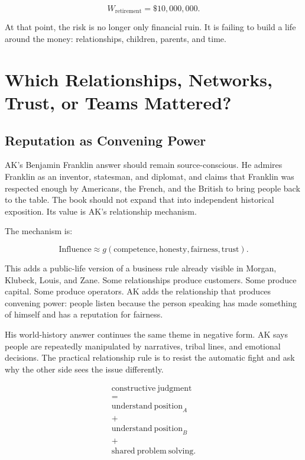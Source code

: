 \documentclass[11pt,oneside]{book}
\begin{document}
\begin{equation}
W_{\mathrm{retirement}}=\$10{,}000{,}000.
\end{equation}

At that point, the risk is no longer only financial ruin. It is failing to build a life around the money: relationships, children, parents, and time.

\chapter{Which Relationships, Networks, Trust, or Teams Mattered?}

\section{Reputation as Convening Power}

AK's Benjamin Franklin answer should remain source-conscious. He admires Franklin as an inventor, statesman, and diplomat, and claims that Franklin was respected enough by Americans, the French, and the British to bring people back to the table. The book should not expand that into independent historical exposition. Its value is AK's relationship mechanism.

The mechanism is:

\begin{equation}
\mathrm{Influence}
\approx
g(\mathrm{competence},\mathrm{honesty},\mathrm{fairness},\mathrm{trust}).
\end{equation}

This adds a public-life version of a business rule already visible in Morgan, Klubeck, Louis, and Zane. Some relationships produce customers. Some produce capital. Some produce operators. AK adds the relationship that produces convening power: people listen because the person speaking has made something of himself and has a reputation for fairness.

His world-history answer continues the same theme in negative form. AK says people are repeatedly manipulated by narratives, tribal lines, and emotional decisions. The practical relationship rule is to resist the automatic fight and ask why the other side sees the issue differently.

\begin{equation}
\begin{gathered}
\mathrm{constructive\ judgment}\\
=\\
\mathrm{understand\ position}_A\\
+\\
\mathrm{understand\ position}_B\\
+\\
\mathrm{shared\ problem\ solving}.
\end{gathered}
\end{equation}
\end{document}
